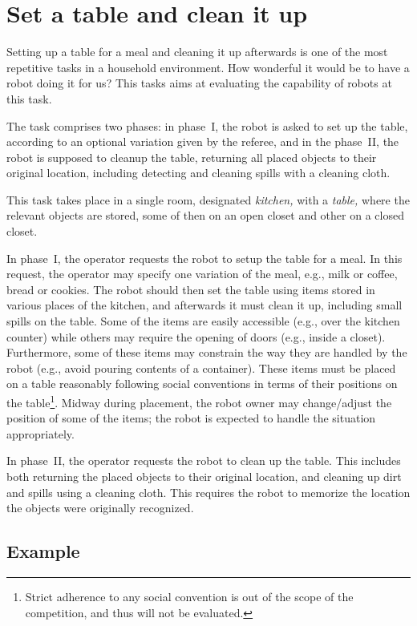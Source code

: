 \section{Set a table and clean it up}

Setting up a table for a meal and cleaning it up afterwards is one of the most repetitive tasks in a household environment. How wonderful it would be to have a robot doing it for us? This tasks aims at evaluating the capability of robots at this task.

The task comprises two phases: in phase~I, the robot is asked to set up the table, according to an optional variation given by the referee, and in the phase~II, the robot is supposed to cleanup the table, returning all placed objects to their original location, including detecting and cleaning spills with a cleaning cloth.

This task takes place in a single room, designated \emph{kitchen,} with a \emph{table,} where the relevant objects are stored, some of then on an open closet and other on a closed closet.

In phase~I, the operator requests the robot to setup the table for a meal. In this request, the operator may specify one variation of the meal, e.g., milk or coffee, bread or cookies. The robot should then set the table using items stored in various places of the kitchen, and afterwards it must clean it up, including small spills on the table. Some of the items are easily accessible (e.g., over the kitchen counter) while others may require the opening of doors (e.g., inside a closet). Furthermore, some of these items may constrain the way they are handled by the robot (e.g., avoid pouring contents of a container). These items must be placed on a table reasonably following social conventions in terms of their positions on the table\footnote{Strict adherence to any social convention is out of the scope of the competition, and thus will not be evaluated.}. Midway during placement, the robot owner may change/adjust the position of some of the items; the robot is expected to handle the situation appropriately.

In phase~II, the operator requests the robot to clean up the table. This includes both returning the placed objects to their original location, and cleaning up dirt and spills using a cleaning cloth. This requires the robot to memorize the location the objects were originally recognized.


\subsection{Example}

